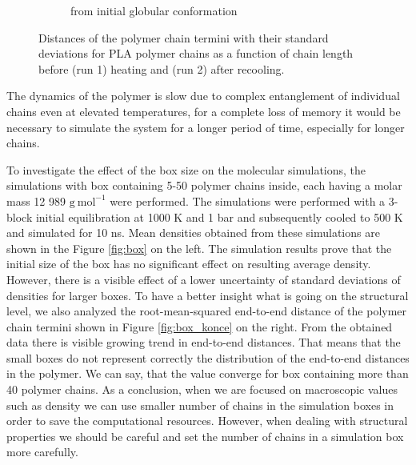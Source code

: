 \begin{figure}[htb!]
\begin{subfigure}{0.5\textwidth}
		\caption{from initial globular conformation}
		\vspace{-0.2cm}
		\label{fig:subim2}
	\end{subfigure}
	\caption{Distances of the polymer chain termini with their standard deviations  for PLA polymer chains as a function of chain length before (run 1) heating and (run 2) after recooling.}
	\label{fig:pla_konce}
\end{figure}      

The dynamics of the polymer is slow due to complex entanglement of individual chains even at elevated temperatures, for a complete loss of memory it would be necessary to simulate the system for a longer period of time, especially for longer chains.

To investigate the effect of the box size on the molecular simulations, the simulations with box containing 5-50 polymer chains inside, each having a molar mass 12 989 $\mathrm{g \ mol^{-1}}$ were performed. The simulations were performed with a 3-block initial equilibration at 1000 K and 1 bar and subsequently cooled to 500 K and simulated for 10 ns. Mean densities obtained from these simulations are shown in the Figure \ref{fig:box} on the left. The simulation results prove that the initial size of the box has no significant effect on resulting average density. However, there is a visible effect of a lower uncertainty of standard deviations of densities for larger boxes. To have a better insight what is going on the structural level, we also analyzed the root-mean-squared end-to-end distance of the polymer chain termini shown in Figure \ref{fig:box_konce} on the right. From the obtained data there is visible growing trend in end-to-end distances. That means that the small boxes do not represent correctly the distribution of the end-to-end distances in the polymer. We can say, that the value converge for box containing more than 40 polymer chains. As a conclusion, when we are focused on macroscopic values such as density we can use smaller number of chains in the simulation boxes in order to save the computational resources. However, when dealing with structural properties we should be careful and set the number of chains in a simulation box more carefully.

